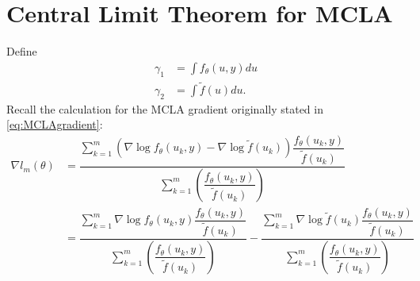 \documentclass{article}
\begin{document}
\section{Central Limit Theorem for MCLA}\label{sec:CLT}
Define
\begin{align}
\gamma_1&= \int f_\theta(u,y) du\\
\gamma_2 &=\int \tilde{f}(u)du.
\end{align}
Recall the calculation for the MCLA gradient originally stated in  \eqref{eq:MCLAgradient}:
\begin{align}
\nabla l_m(\theta)&= \dfrac{\sum_{k=1}^m    \left( \nabla \log f_\theta(u_k,y) - \nabla \log \tilde{f} (u_k)  \right) \dfrac{f_\theta(u_k,y)}{\tilde{f}(u_k)} }{\sum_{k=1}^m \left( \dfrac{f_\theta(u_k,y)}{\tilde{f}(u_k)} \right) }\\
&=\dfrac{\sum_{k=1}^m     \nabla \log f_\theta(u_k,y)   \dfrac{f_\theta(u_k,y)}{\tilde{f}(u_k)} }{\sum_{k=1}^m \left( \dfrac{f_\theta(u_k,y)}{\tilde{f}(u_k)} \right) }   -\dfrac{\sum_{k=1}^m     \nabla \log \tilde{f}(u_k)   \dfrac{f_\theta(u_k,y)}{\tilde{f}(u_k)} }{\sum_{k=1}^m \left( \dfrac{f_\theta(u_k,y)}{\tilde{f}(u_k)} \right) }
\end{align}
\end{document}
